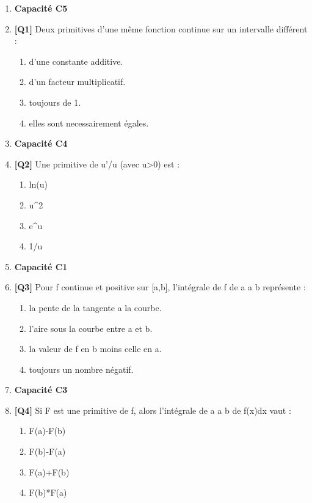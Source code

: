 \begin{enumerate}

\item[] \textbf{Capacité C5}

\item \textbf{[Q1]} Deux primitives d'une même fonction continue sur un intervalle différent :
  \begin{enumerate}[label=\Alph*.]
    \item d'une constante additive.
    \item d'un facteur multiplicatif.
    \item toujours de 1.
    \item elles sont necessairement égales.
  \end{enumerate}

\item[] \textbf{Capacité C4}

\item \textbf{[Q2]} Une primitive de u'/u (avec u>0) est :
  \begin{enumerate}[label=\Alph*.]
    \item ln(u)
    \item u\textasciicircum{}2
    \item e\textasciicircum{}u
    \item 1/u
  \end{enumerate}

\item[] \textbf{Capacité C1}

\item \textbf{[Q3]} Pour f continue et positive sur [a,b], l'intégrale de f de a a b représente :
  \begin{enumerate}[label=\Alph*.]
    \item la pente de la tangente a la courbe.
    \item l'aire sous la courbe entre a et b.
    \item la valeur de f en b moins celle en a.
    \item toujours un nombre négatif.
  \end{enumerate}

\item[] \textbf{Capacité C3}

\item \textbf{[Q4]} Si F est une primitive de f, alors l'intégrale de a a b de f(x)dx vaut :
  \begin{enumerate}[label=\Alph*.]
    \item F(a)-F(b)
    \item F(b)-F(a)
    \item F(a)+F(b)
    \item F(b)*F(a)
  \end{enumerate}


\end{enumerate}
